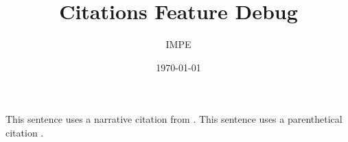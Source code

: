 \documentclass[12pt]{article}
\title{Citations Feature Debug}
\author{IMPE}
\date{\today}
\begin{document}
\maketitle

This sentence uses a narrative citation from \textcite{sample2026}.
This sentence uses a parenthetical citation \parencite{sample2026}.

\printbibliography
\end{document}
